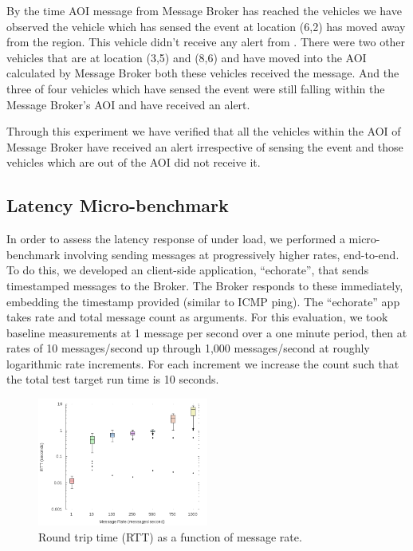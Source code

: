 By the time AOI message from Message Broker has reached the vehicles
we have observed the vehicle which has sensed the event at location
(6,2) has moved away from the region. This vehicle didn't receive any
alert from \name.  There were two other vehicles that are at
location (3,5) and (8,6) and have moved into the AOI calculated by
Message Broker both these vehicles received the message. And the three
of four vehicles which have sensed the event were still falling within
the Message Broker's AOI and have received an alert.
   
Through this experiment we have verified that all the vehicles within the
AOI of Message Broker have received an alert irrespective of sensing
the event and those vehicles which are out of the AOI did not receive it.

\subsection{Latency Micro-benchmark}

In order to assess the latency response of \name under load, we
performed a micro-benchmark involving sending messages at
progressively higher rates, end-to-end. To do this, we developed an
client-side application, ``echorate'', that sends timestamped messages
to the Broker. The Broker responds to these immediately, embedding the
timestamp provided (similar to ICMP ping). The ``echorate'' app takes
rate and total message count as arguments. For this evaluation, we
took baseline measurements at 1 message per second over a one minute
period, then at rates of 10 messages/second up through 1,000
messages/second at roughly logarithmic rate increments. For each increment
we increase the count such that the total test target run time is
10 seconds.

\begin{figure}[ht]
  \begin{center}
    \includegraphics[width=0.5\textwidth]{figs/RTT.png}
    \caption{Round trip time (RTT) as a function of message rate.}
    \label{fig:RTT}
  \end{center}
\end{figure}

